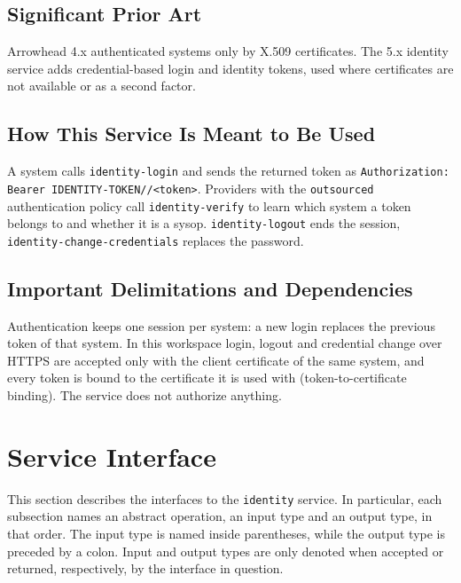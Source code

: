 \documentclass[a4paper]{arrowhead}
\begin{document}
\subsection{Significant Prior Art}

Arrowhead 4.x authenticated systems only by X.509 certificates. The 5.x identity service adds credential-based login and identity tokens, used where certificates are not available or as a second factor.

\subsection{How This Service Is Meant to Be Used}

A system calls \texttt{identity-\allowbreak{}login} and sends the returned token as \texttt{Authorization: Bearer IDENTITY-\allowbreak{}TOKEN/\allowbreak{}/\allowbreak{}\textless{}token\textgreater{}}. Providers with the \texttt{outsourced} authentication policy call \texttt{identity-\allowbreak{}verify} to learn which system a token belongs to and whether it is a sysop. \texttt{identity-\allowbreak{}logout} ends the session, \texttt{identity-\allowbreak{}change-\allowbreak{}credentials} replaces the password.

\subsection{Important Delimitations and Dependencies}
\label{sec:delimitations}

Authentication keeps one session per system: a new login replaces the previous token of that system. In this workspace login, logout and credential change over HTTPS are accepted only with the client certificate of the same system, and every token is bound to the certificate it is used with (token-to-certificate binding). The service does not authorize anything.

\newpage

\section{Service Interface}
\label{sec:operations}

This section describes the interfaces to the \texttt{identity} service.
In particular, each subsection names an abstract operation, an input type and an output type, in that order.
The input type is named inside parentheses, while the output type is preceded by a colon.
Input and output types are only denoted when accepted or returned, respectively, by the interface in question.
\end{document}
